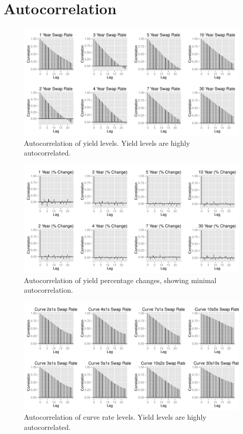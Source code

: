\section{Autocorrelation}

\begin{figure}[H]
\centering\includegraphics[width=\textwidth]{acf-yields.pdf}
\caption{Autocorrelation of yield levels. Yield levels are highly autocorrelated.}
\label{fig:acf-yields}
\end{figure}

\begin{figure}[H]
\centering\includegraphics[width=\textwidth]{acf-yields-returns.pdf}
\caption{Autocorrelation of yield percentage changes, showing minimal autocorrelation.}
\label{fig:acf-yields-returns}
\end{figure}

\begin{figure}[H]
\centering\includegraphics[width=\textwidth]{acf-curve.pdf}
\caption{Autocorrelation of curve rate levels. Yield levels are highly autocorrelated.}
\label{fig:acf-curve}
\end{figure}


